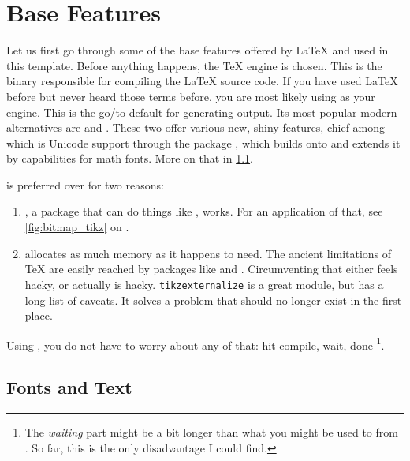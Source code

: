 \chapter{Base Features}
\label{ch:base-features}

Let us first go through some of the base features offered by \LaTeX{} and used in
this template.
Before anything happens, the \TeX{} engine is chosen.
This is the binary responsible for compiling the \LaTeX{} source code.
If you have used \LaTeX{} before but never heard those terms before, you are most
likely using  as your engine.
This is the go\-/to default for generating  output.
Its most popular modern alternatives are  and .
These two offer various new, shiny features, chief among which is Unicode
support through the package , which builds onto
 and extends it by capabilities for math fonts.
More on that in \cref{ch:fonts_text}.

 is preferred over  for two reasons:
\begin{enumerate}
    \item {}, a package that can do things like
        , works.
        For an application of that, see \cref{fig:bitmap_tikz} on
        .
    \item {} allocates as much memory as it happens to need.
        The ancient limitations of \TeX{} are easily reached by packages like
         and .
        Circumventing that either feels hacky, or actually is hacky.
        \texttt{tikzexternalize} is a great module, but has a long list of caveats.
        It solves a problem that should no longer exist in the first place.
\end{enumerate}
Using , you do not have to worry about any of that:
hit compile, wait, done%
\footnote{
    The \emph{waiting} part might be a bit longer than what you might be used to
    from .
    So far, this is the only disadvantage I could find.
}.

\section{Fonts and Text}
\label{ch:fonts_text}

